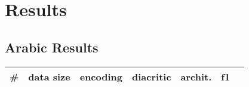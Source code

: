 \section*{Results}

\subsection*{Arabic Results}
\begin{center}
 \begin{tabular}{c c c c c c c}
     \toprule
     \small{\#                    }& 
     \small{data size    }& 
     \small{encoding     }&
     \small{diacritic    }&
     \small{archit.      }&
     \small{f1           }     \\
     \midrule



\end{tabular}
\end{center}
